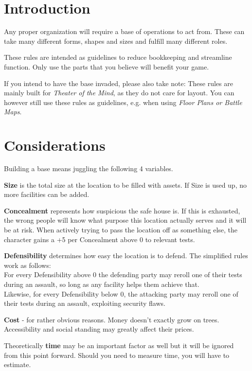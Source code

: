 \documentclass[12pt,a4paper,openany,usenames,dvipsnames]{book}
\begin{document}
	

	\chapter{Introduction}
	Any proper organization will require a base of operations to act from.
	These can take many different forms, shapes and sizes and fulfill many different roles.
	\par
	These rules are intended as guidelines to reduce bookkeeping and streamline function.
	Only use the parts that you believe will benefit your game.
	\par
	If you intend to have the base invaded, please also take note:
	These rules are mainly built for \emph{Theater of the Mind}, as they do not care for layout.
	You can however still use these rules as guidelines, e.g. when using \emph{Floor Plans or Battle Maps}.

	\chapter{Considerations}
	\vspace*{-10mm}
	Building a base means juggling the following 4 variables.\par
	\textbf{Size} is the total size at the location to be filled with assets.
		If Size is used up, no more facilities can be added.\par
	\textbf{Concealment} represents how suspicious the safe house is.
		If this is exhausted, the wrong people will know what purpose this location actually serves and it will be at risk.
		When actively trying to pass the location off as something else,
			the character gains a +5 per Concealment above 0 to relevant tests.\par
	\textbf{Defensibility} determines how easy the location is to defend.
		The simplified rules work as follows:\\
		For every Defensibility above 0 the defending party may reroll one of their tests during an assault,
			so long as any facility helps them achieve that.\\
		Likewise, for every Defensibility below 0,
			the attacking party may reroll one of their tests during an assault,
			exploiting security flaws.\par
	\textbf{Cost} - for rather obvious reasons.
		Money doesn't exactly grow on trees.
		Accessibility and social standing may greatly affect their prices.\par
	Theoretically \textbf{time} may be an important factor as well but it will be ignored from this point forward.
		Should you need to measure time, you will have to estimate.
\end{document}
